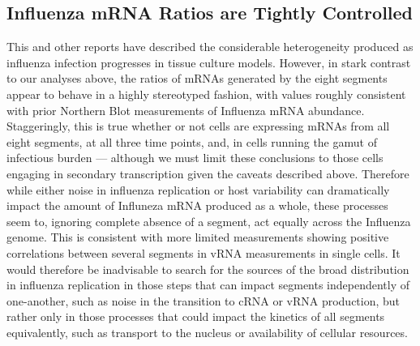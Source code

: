 \documentclass[9pt,lineno]{elife}
\begin{document}
\subsection{Influenza mRNA Ratios are Tightly Controlled}
	
	This and other reports have described the considerable heterogeneity produced as influenza infection progresses in tissue culture models. However, in stark contrast to our analyses above, the ratios of mRNAs generated by the eight segments appear to behave in a highly stereotyped fashion, with values roughly consistent with prior Northern Blot measurements of Influenza mRNA abundance. Staggeringly, this is true whether or not cells are expressing mRNAs from all eight segments, at all three time points,  and, in cells running the gamut of infectious burden --- although we must limit these conclusions to those cells engaging in secondary transcription given the caveats described above. Therefore while either noise in influenza replication or host variability can dramatically impact the amount of Influneza mRNA produced as a whole, these processes seem to, ignoring complete absence of a segment, act equally across the Influenza genome. This is consistent with more limited measurements showing positive correlations between several segments in vRNA measurements in single cells. It would therefore be inadvisable to search for the sources of the broad distribution in influenza replication in those steps that can impact segments independently of one-another, such as noise in the transition to cRNA or vRNA production, but rather only in those processes that could impact the kinetics of all segments equivalently, such as transport to the nucleus or availability of cellular resources. 
\end{document}

